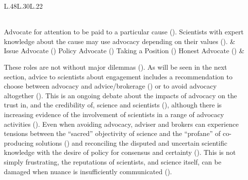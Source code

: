\begin{table}[!ht]
\begin{tabular}{L{.48\linewidth}L{.30\linewidth}L{.22\linewidth}}
\rule{0pt}{4ex} \\ 
Advocate for attention to be paid to a particular cause (\cite{KarkkainenLKK2024}). Scientists with expert knowledge about the cause may use advocacy depending on their values (\cite{RykielEtAl2002,RapleyD2014,ElsensohnACDGGKPRS2019}).  & Issue Advocate (\cite{Pielke2007}) Policy Advocate (\cite{ScottRLPAFSRSS2007}) Taking a Position (\cite{SteelLLS2004}) Honest Advocate (\cite{RoseBOP2018,GregoryBW2024}) %
& \textcite{SteelLLS2004,ScottRLPAFSRSS2007,SinghTKMMC2014,RoseBOP2018,DablanderSCSBGGBAH2024} \\ \hline
\end{tabular}
\end{table}

These roles are not without major dilemmas (\cite{CairneyO2020}). As will be seen in the next section, advice to scientists about \SPI{} engagement includes a recommendation to choose between advocacy and advice/brokerage (\cite{OliverC2019}) or to avoid advocacy altogether (\cite{Gluckman2014}). This is an ongoing debate about the impacts of advocacy on the trust in, and the credibility of, science and scientists (\cite{Edwards2013,GregoryBW2024,ColognaKMBMO2024,DablanderSCSBGGBAH2024,RykielEtAl2002}), although there is increasing evidence of the involvement of \CAN{} scientists in a range of advocacy activities (\cite{ColognaKMBMO2024,DablanderSCSBGGBAH2024,ScottRLPAFSRSS2007}). Even when avoiding advocacy, adviser and brokers can experience tensions between the ``sacred'' objectivity of science and the ``profane'' of co-producing solutions (\cite{WesselinkH2020,MacKillopCDD2023}) and reconciling the disputed and uncertain scientific knowledge with the desire of policy for consensus and certainty (\cite{Stirling2010,Hicks2024}). This is not simply frustrating, the reputations of scientists, and science itself, can be damaged when nuance is insufficiently communicated (\cite{Stirling2010,OjanenBKP2021}).

